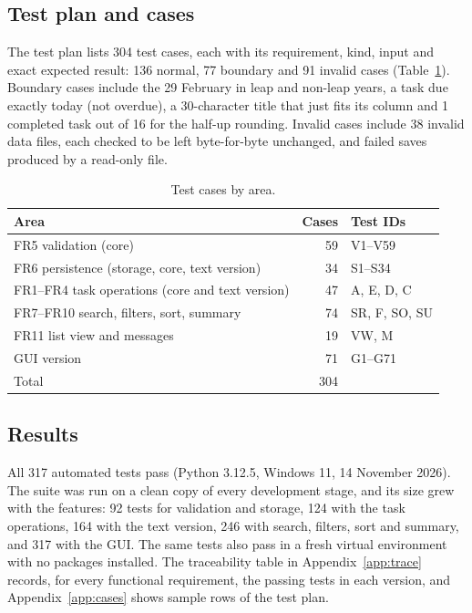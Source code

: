 \documentclass[11pt,a4paper]{article}
\begin{document}
\subsection{Test plan and cases}
The test plan lists 304 test cases, each with its requirement, kind, input and
exact expected result: 136 normal, 77 boundary and 91 invalid cases
(Table~\ref{tab:plan}). Boundary cases include the 29 February in leap and
non-leap years, a task due exactly today (not overdue), a 30-character title
that just fits its column and 1 completed task out of 16 for the half-up
rounding. Invalid cases include 38 invalid data files, each checked to be
left byte-for-byte unchanged, and failed saves produced by a read-only file.

\begin{table}[ht]
\centering
\small
\begin{tabular}{@{}lrl@{}}
\toprule
Area & Cases & Test IDs \\
\midrule
FR5 validation (core) & 59 & V1--V59 \\
FR6 persistence (storage, core, text version) & 34 & S1--S34 \\
FR1--FR4 task operations (core and text version) & 47 & A, E, D, C \\
FR7--FR10 search, filters, sort, summary & 74 & SR, F, SO, SU \\
FR11 list view and messages & 19 & VW, M \\
GUI version & 71 & G1--G71 \\
\midrule
Total & 304 & \\
\bottomrule
\end{tabular}
\caption{Test cases by area.}
\label{tab:plan}
\end{table}

\subsection{Results}
All 317 automated tests pass (Python 3.12.5, Windows 11, 14 November 2026).
The suite was run on a clean copy of every development stage, and its size
grew with the features: 92 tests for validation and storage, 124 with the
task operations, 164 with the text version, 246 with search, filters, sort
and summary, and 317 with the GUI. The same tests also pass in a fresh virtual
environment with no packages installed. The traceability table in
Appendix~\ref{app:trace} records, for every functional requirement, the
passing tests in each version, and Appendix~\ref{app:cases} shows sample
rows of the test plan.
\end{document}
